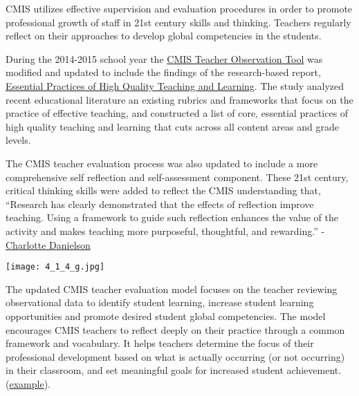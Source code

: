 
\begin{findings}
CMIS utilizes effective supervision and evaluation procedures in order to promote professional growth of staff in 21st century skills and thinking. Teachers regularly reflect on their approaches to develop global competencies in the students.

During the 2014-2015 school year the \href{https://docs.google.com/document/d/15_5X5QtixmWVheEUBVO9N1aislsLDm_ZW4-4g4YQ7F4/edit?usp=sharing}{CMIS Teacher Observation Tool} was modified and updated to include the findings of the research-based report, \href{https://drive.google.com/a/cmis.ac.th/file/d/0Bwny3HLdIIS7bXJ0dEpCWG51MTQ/view?usp=sharing}{Essential Practices of High Quality Teaching and Learning}. The study analyzed recent educational literature an existing rubrics and frameworks that focus on the practice of effective teaching, and constructed a list of core, essential practices of high quality teaching and learning that cuts across all content areas and grade levels. 

The CMIS teacher evaluation process was also updated to include a more comprehensive self reflection and self-assessment component. These 21st century, critical thinking skills were added to reflect the CMIS understanding that, ``Research has clearly demonstrated that the effects of reflection improve teaching. Using a framework to guide such reflection enhances the value of the activity and makes teaching more purposeful, thoughtful, and rewarding.'' -\href{http://www.ascd.org/publications/books/106034/chapters/Using-the-Framework.aspx}{Charlotte Danielson} 

{\centering\texttt{[image: 4\_1\_4\_g.jpg]}}

The updated CMIS teacher evaluation model focuses on the teacher reviewing observational data to identify student learning, increase student learning opportunities and promote desired student global competencies. The  model encourages CMIS teachers to reflect deeply on their practice through a common framework and vocabulary. It helps teachers determine the focus of their professional development based on what is actually occurring (or not occurring) in their classroom, and set meaningful goals for increased student achievement. (\href{https://docs.google.com/a/cmis.ac.th/document/d/165_Y3vfELwhJhwqYfrxoCYSB4c9vZHS1a6p_KSXSzt8/edit?usp=sharing}{example}).


\end{findings}
